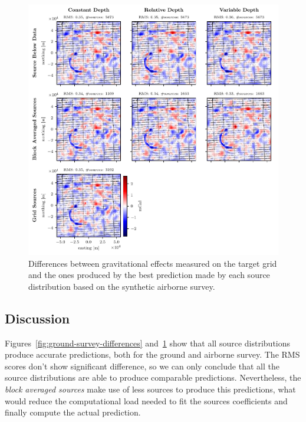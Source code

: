 \documentclass[twocolumn]{article}
\begin{document}
\begin{figure}
    \includegraphics[width=\linewidth]{figs/airborne_survey_differences.pdf}
    \caption{
        Differences between gravitational effects measured on the target grid
        and the ones produced by the best prediction made by each source
        distribution based on the synthetic airborne survey.
    }
    \label{fig:airborne-survey-differences}
\end{figure}



\subsection{Discussion}

Figures~\ref{fig:ground-survey-differences}
and~\ref{fig:airborne-survey-differences} show that all source distributions
produce accurate predictions, both for the ground and airborne survey.
The RMS scores don't show significant difference, so we can only conclude
that all the source distributions are able to produce comparable predictions.
Nevertheless, the \emph{block averaged sources} make use of less sources to
produce this predictions, what would reduce the computational load needed to
fit the sources coefficients and finally compute the actual prediction.
\end{document}
